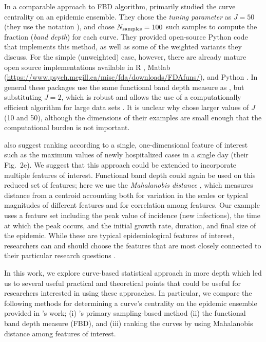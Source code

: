 \documentclass[fleqn,10pt,lineno]{wlpeerj}
\begin{document}
In a comparable approach to FBD algorithm, \juul primarily studied the curve centrality on an epidemic ensemble. They chose the \emph{tuning parameter} as $J=50$ (they use the notation \ncurve), and chose $N_{\textrm{samples}}=100$ such samples to compute the fraction (\emph{band depth}) for each curve. They provided open-source Python code that implements this method, as well as some of the weighted variants they discuss. For the simple (unweighted) case, however, there are already mature open source implementations available in R \citep{fda_pkg,roahd}, Matlab (\url{https://www.psych.mcgill.ca/misc/fda/downloads/FDAfuns/}), and Python \citep{seabold2010statsmodels}. In general these packages use the same functional band depth measure as \juul, but substituting $J=2$, which is robust \citep{lopez2009concept} and allows the use of a computationally efficient algorithm for large data sets \citep{sun2012exact}. It is unclear why \juul chose larger values of $J$ (10 and 50), although the dimensions of their examples are small enough that the computational burden is not important.

\juul also suggest ranking according to a single, one-dimensional feature of interest such as the maximum values of newly hospitalized cases in a single day (their Fig.~2e). We suggest that this approach could be extended to incorporate multiple features of interest. Functional band depth could again be used on this reduced set of features; here we use the \emph{Mahalanobis distance} \citep{mahalanobis1936generalized}, which measures distance from a centroid accounting both for variation in the scales or typical magnitudes of different features and for correlation among features.
Our example uses a feature set including the peak value of incidence (new infections), the time at which the peak occurs, and the initial growth rate, duration, and final size of the epidemic. While these are typical epidemiological features of interest, researchers can and should choose the features that are most closely connected to their particular research questions \citep{probert2016decision}.

In this work, we explore \juul curve-based statistical approach in more depth which led us to several useful practical and theoretical points that could be useful for researchers interested in using these approaches. In particular, we compare the following methods for determining a curve's centrality on the epidemic ensemble provided in \juul's work; (i) \juul's primary sampling-based method (ii) the functional band depth measure (FBD), and (iii) ranking the curves by using Mahalanobis distance among features of interest.
\end{document}
